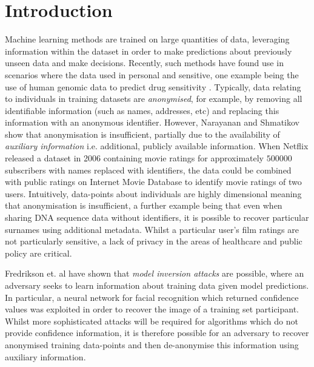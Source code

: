 \chapter{Introduction}
%
\graphicspath{{Introduction/Figs}}

Machine learning methods are trained on large quantities of data, leveraging information within the dataset in order to make predictions about previously unseen data and make decisions. Recently, such methods have found use in scenarios where the data used in personal and sensitive, one example being the use of human genomic data to predict drug sensitivity \cite{drugSensitivity}. Typically, data relating to individuals in training datasets are \emph{anonymised}, for example, by removing all identifiable information (such as names, addresses, etc) and replacing this information with an anonymous identifier. However, Narayanan and Shmatikov show that anonymisation is insufficient, partially due to the availability of \emph{auxiliary information} i.e. additional, publicly available information. When Netflix released a dataset in 2006 containing movie ratings for approximately $500000$ subscribers with names replaced with identifiers, the data could be combined with public ratings on Internet Movie Database to identify movie ratings of two users. \cite{netflix} Intuitively, data-points about individuals are highly dimensional meaning that anonymisation is insufficient, a further example being that even when sharing DNA sequence data without identifiers, it is possible to recover particular surnames using additional metadata. \cite{gymrek2013identifying} Whilst a particular user's film ratings are not particularly sensitive, a lack of privacy in the areas of healthcare and public policy are critical.  

Fredrikson et. al have shown that \emph{model inversion attacks} are possible, where an adversary seeks to learn information about training data given model predictions. In particular, a neural network for facial recognition which returned confidence values was exploited in order to recover the image of a training set participant. Whilst more sophisticated attacks will be required for algorithms which do not provide confidence information, it is therefore possible for an adversary to recover anonymised training data-points and then de-anonymise this information using auxiliary information. \cite{modelInversion} 

